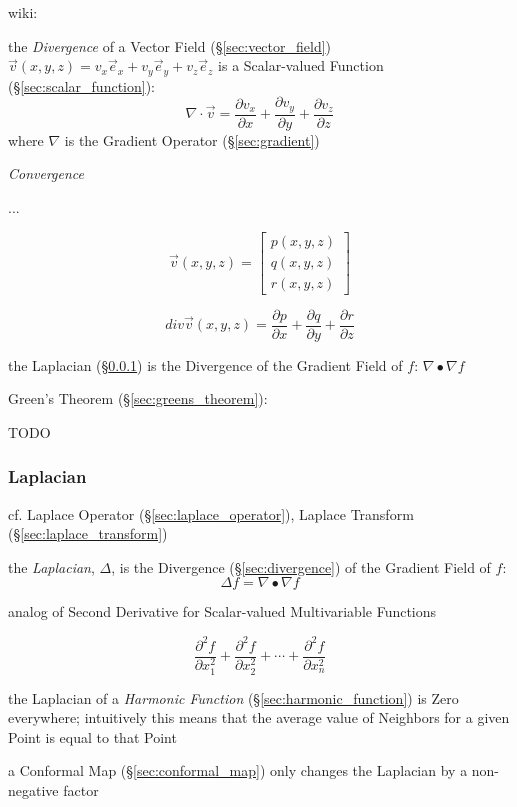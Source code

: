wiki:

the \emph{Divergence} of a Vector Field (\S\ref{sec:vector_field})
$\vec{v}(x,y,z) = v_x\vec{e}_x + v_y\vec{e}_y + v_z\vec{e}_z$ is a
Scalar-valued Function (\S\ref{sec:scalar_function}):
\[
  \nabla \cdot \vec{v} =
    \frac{\partial v_x}{\partial x} +
    \frac{\partial v_y}{\partial y} +
    \frac{\partial v_z}{\partial z}
\]
where $\nabla$ is the Gradient Operator (\S\ref{sec:gradient})

\emph{Convergence}

...

\[
  \vec{v}(x,y,z) = \begin{bmatrix}
    p(x,y,z) \\
    q(x,y,z) \\
    r(x,y,z)
  \end{bmatrix}
\]

\[
  div\vec{v}(x,y,z)
    = \frac{\partial{p}}{\partial{x}}
    + \frac{\partial{q}}{\partial{y}}
    + \frac{\partial{r}}{\partial{z}}
\]

the Laplacian (\S\ref{sec:laplacian}) is the Divergence of the Gradient Field
of $f$: $\nabla \bullet \nabla f$

Green's Theorem (\S\ref{sec:greens_theorem}):

TODO



\subsubsection{Laplacian}\label{sec:laplacian}

\fist cf. Laplace Operator (\S\ref{sec:laplace_operator}), Laplace Transform
(\S\ref{sec:laplace_transform}) %

the \emph{Laplacian}, $\Delta$, is the Divergence (\S\ref{sec:divergence}) of
the Gradient Field of $f$:
\[
  \Delta f = \nabla \bullet \nabla f
\]

analog of Second Derivative for Scalar-valued Multivariable Functions

\[
  \frac{\partial^2 f}{\partial{x_1^2}} +
  \frac{\partial^2 f}{\partial{x_2^2}} +
  \cdots +
  \frac{\partial^2 f}{\partial{x_n^2}}
\]

the Laplacian of a \emph{Harmonic Function} (\S\ref{sec:harmonic_function}) is
Zero everywhere; intuitively this means that the average value of Neighbors for
a given Point is equal to that Point

a Conformal Map (\S\ref{sec:conformal_map}) only changes the Laplacian by a
non-negative factor



